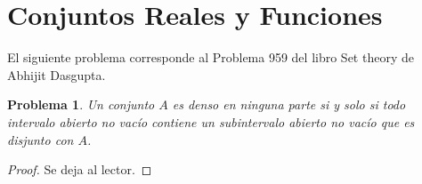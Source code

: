 \documentclass[a4,10pt]{aleph-notas}
\newtheorem*{prob}{Problema}
\begin{document}
\encabezado

\section{Conjuntos Reales y Funciones}

\noindent
El siguiente problema corresponde al Problema 959 del libro Set theory de Abhijit Dasgupta.

\begin{prob}
    Un conjunto $A$ es denso en ninguna parte si y solo si todo intervalo abierto no vacío contiene un subintervalo abierto no vacío que es disjunto con $A$.
\end{prob}

\begin{proof}
    Se deja al lector.
\end{proof}
    
\end{document}
